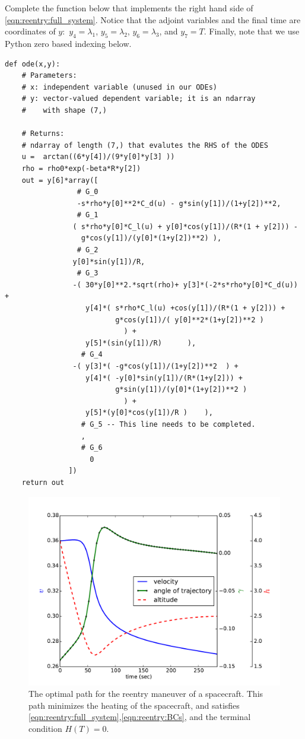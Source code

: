 \begin{problem}
Complete the function  below that implements the right hand side of \eqref{eqn:reentry:full_system}. 
Notice that the adjoint variables and the final time are coordinates of $y:$ $y_4 = \lambda_1$, $y_5 = \lambda_2$, $y_6=\lambda_3$, and $y_7 = T$. Finally, note that we use Python zero based indexing below.
\begin{lstlisting}
def ode(x,y):
	# Parameters:
	# x: independent variable (unused in our ODEs)
	# y: vector-valued dependent variable; it is an ndarray 
	# 	 with shape (7,)
	
	# Returns: 
	# ndarray of length (7,) that evalutes the RHS of the ODES
	u =	 arctan((6*y[4])/(9*y[0]*y[3] ))
	rho = rho0*exp(-beta*R*y[2])
	out = y[6]*array([
				 # G_0
				 -s*rho*y[0]**2*C_d(u) - g*sin(y[1])/(1+y[2])**2,	
				 # G_1	 
				( s*rho*y[0]*C_l(u) + y[0]*cos(y[1])/(R*(1 + y[2])) - 
				  g*cos(y[1])/(y[0]*(1+y[2])**2) ),						 
				 # G_2
				y[0]*sin(y[1])/R,		
				 # G_3								 
				-( 30*y[0]**2.*sqrt(rho)+ y[3]*(-2*s*rho*y[0]*C_d(u)) + 
				   y[4]*( s*rho*C_l(u) +cos(y[1])/(R*(1 + y[2])) + 
						  g*cos(y[1])/( y[0]**2*(1+y[2])**2 ) 
							) + 
				   y[5]*(sin(y[1])/R)	   ),	
				  # G_4						 
				-( y[3]*( -g*cos(y[1])/(1+y[2])**2	) + 
				   y[4]*( -y[0]*sin(y[1])/(R*(1+y[2])) + 
						  g*sin(y[1])/(y[0]*(1+y[2])**2 ) 
							) + 
				   y[5]*(y[0]*cos(y[1])/R )	   ),
				  # G_5 -- This line needs to be completed.						 
				  ,			
				  # G_6	
					0 									 
			   ])
	return out
\end{lstlisting}
\end{problem}

\begin{figure}
\centering
\includegraphics[width=\textwidth]{solutions.pdf}
\caption{The optimal path for the reentry maneuver of a spacecraft. 
This path minimizes the heating of the spacecraft, and satisfies  \eqref{eqn:reentry:full_system},\eqref{eqn:reentry:BCs}, and the terminal condition $H(T) = 0$.
}
\label{fig:reentry:solutions}
\end{figure}


